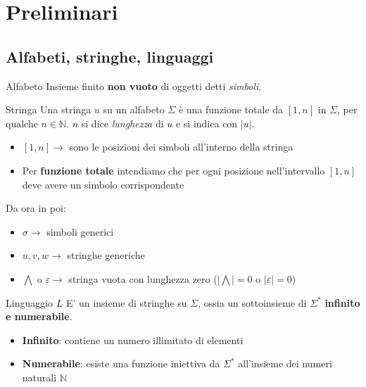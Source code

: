 \documentclass[12pt, a4paper]{report}
\begin{document}
    \newpage
    \tableofcontents
    \chapter{Preliminari}
        \section{Alfabeti, stringhe, linguaggi}
            \begin{definitionbox}{Alfabeto}{}
                Insieme finito \textbf{non vuoto} di oggetti detti \textit{simboli}.
            \end{definitionbox}
            \begin{definitionbox}{Stringa}{}
                Una stringa $u$ su un alfabeto $\Sigma$ è una funzione totale da $[1,n]$ in $\Sigma$, per qualche $n\in\mathbb{N}$. 
                $n$ si dice \textit{lunghezza} di $u$ e si indica con $|u|$. 
            \end{definitionbox}
            \begin{itemize}
                \item $[1,n]\rightarrow$ sono le posizioni dei simboli all'interno della stringa 
                \item Per \textbf{funzione totale} intendiamo che per ogni posizione nell'intervallo $[1,n]$ deve avere un simbolo corrispondente 
            \end{itemize}
            Da ora in poi: 
            \begin{itemize}
                \item $\sigma\rightarrow$ simboli generici 
                \item $u,v,w\rightarrow$ stringhe generiche 
                \item $\bigwedge\text{ o }\varepsilon\rightarrow$ stringa vuota con lunghezza zero ($\left|\bigwedge\right|=0$ o $\left|\varepsilon\right|=0$) 
            \end{itemize}
            \begin{definitionbox}{Linguaggio $L$}{}
                E' un insieme di stringhe su $\Sigma$, ossia un sottoinsieme di $\Sigma^*$ \textbf{infinito e numerabile}. 
            \end{definitionbox}
            \begin{itemize}
                \item \textbf{Infinito}: contiene un numero illimitato di elementi 
                \item \textbf{Numerabile}: esiste una funzione iniettiva da $\Sigma^*$ all'insieme dei numeri naturali $\mathbb{N}$ 
            \end{itemize}
\end{document}
